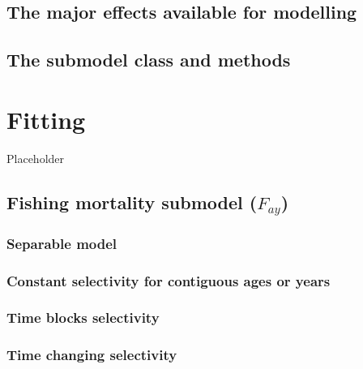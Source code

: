 \documentclass[
]{book}
\begin{document}
\hypertarget{the-major-effects-available-for-modelling}{%
\section{The major effects available for modelling}\label{the-major-effects-available-for-modelling}}

\hypertarget{the-submodel-class-and-methods}{%
\section{The submodel class and methods}\label{the-submodel-class-and-methods}}

\hypertarget{fitting}{%
\chapter{Fitting}\label{fitting}}

Placeholder

\hypertarget{fishing-mortality-submodel-f_ay}{%
\section{\texorpdfstring{Fishing mortality submodel (\(F_{ay}\))}{Fishing mortality submodel (F\_\{ay\})}}\label{fishing-mortality-submodel-f_ay}}

\hypertarget{separable-model}{%
\subsection{Separable model}\label{separable-model}}

\hypertarget{constant-selectivity-for-contiguous-ages-or-years}{%
\subsection{Constant selectivity for contiguous ages or years}\label{constant-selectivity-for-contiguous-ages-or-years}}

\hypertarget{time-blocks-selectivity}{%
\subsection{Time blocks selectivity}\label{time-blocks-selectivity}}

\hypertarget{time-changing-selectivity}{%
\subsection{Time changing selectivity}\label{time-changing-selectivity}}
\end{document}
